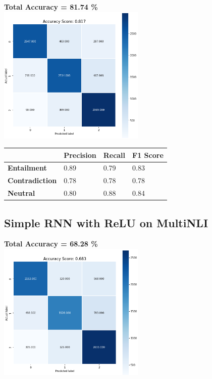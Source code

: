 \documentclass[12pt, conference]{IEEEtran}
\begin{document}
\textbf{Total Accuracy = 81.74 \%}\\
\includegraphics[width=7cm]{images/results/SNLIrelu.png}

\begin{table}[h]
\begin{tabular}{|l|l|l|l|}
\hline
  & \textbf{Precision} & \textbf{Recall} & \textbf{F1 Score} \\ \hline
\textbf{Entailment} & 0.89               & 0.79            & 0.83              \\ \hline
\textbf{Contradiction} & 0.78               & 0.78            & 0.78              \\ \hline
\textbf{Neutral} & 0.80               & 0.88            & 0.84              \\ \hline
\end{tabular}
\end{table}

\subsection{Simple RNN with ReLU on MultiNLI}

\textbf{Total Accuracy = 68.28 \%}\\
\includegraphics[width=7cm]{images/results/MNLIrelu.png}
\end{document}
